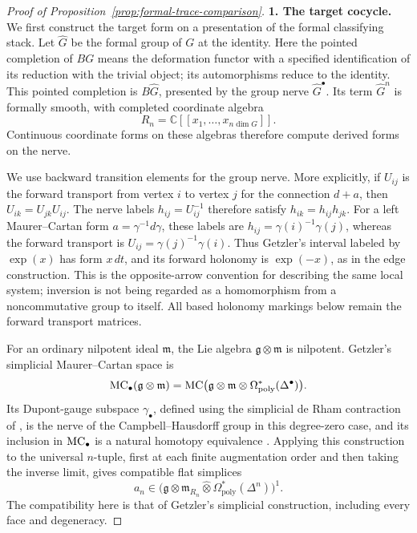 \begin{proof}[Proof of Proposition~\ref{prop:formal-trace-comparison}]
\noindent\textbf{1. The target cocycle.}\quad
We first construct the target form on a presentation of the formal
classifying stack.  Let \(\widehat G\) be the formal group of \(G\)
at the identity.  Here the pointed completion of \(BG\) means the
deformation functor with a specified identification of its reduction
with the trivial object; its automorphisms reduce to the identity.
This pointed completion is \(B\widehat G\), presented by the group nerve
\(\widehat G^\bullet\).  Its term \(\widehat G^n\) is formally smooth,
with completed coordinate algebra
\[
                  R_n=\mathbb C[[x_1,\ldots,x_{n\dim G}]].
\]
Continuous coordinate forms on these algebras therefore compute
derived forms on the nerve.

We use backward transition elements for the group nerve.  More explicitly,
if \(U_{ij}\) is the forward transport from vertex \(i\) to vertex \(j\)
for the connection \(d+a\), then
\(U_{ik}=U_{jk}U_{ij}\).  The nerve labels
\(h_{ij}=U_{ij}^{-1}\) therefore satisfy
\(h_{ik}=h_{ij}h_{jk}\).  For a left Maurer--Cartan form
\(a=\gamma^{-1}d\gamma\), these labels are
\(h_{ij}=\gamma(i)^{-1}\gamma(j)\), whereas the forward transport is
\(U_{ij}=\gamma(j)^{-1}\gamma(i)\).  Thus Getzler's interval labeled
by \(\exp(x)\) has form \(x\,dt\), and its forward holonomy is
\(\exp(-x)\), as in the edge construction.  This is the opposite-arrow
convention for describing the same local system; inversion is not being
regarded as a homomorphism from a noncommutative group to itself.  All
based holonomy markings below remain the forward transport matrices.

For an ordinary nilpotent ideal \(\mathfrak m\), the Lie algebra
\(\mathfrak g\otimes\mathfrak m\) is nilpotent.  Getzler's simplicial
Maurer--Cartan space is
\[
 \operatorname{MC}_\bullet(\mathfrak g\otimes\mathfrak m)
 =\operatorname{MC}\bigl(\mathfrak g\otimes\mathfrak m
                     \otimes\Omega_{\mathrm{poly}}^*(\Delta^\bullet)\bigr).
\]
Its Dupont-gauge subspace \(\gamma_\bullet\), defined using the
simplicial de Rham contraction of \cite{Dupont1976}, is the nerve of the
Campbell--Hausdorff group in this degree-zero case, and its inclusion
in \(\operatorname{MC}_\bullet\) is a natural homotopy equivalence
\cite[\S1, Theorem~5.4, and Corollary~5.11]{Getzler2009}.
Applying this construction to the universal \(n\)-tuple, first at
each finite augmentation order and then taking the inverse limit,
gives compatible flat simplices
\[
 a_n\in
 \bigl(\mathfrak g\otimes\mathfrak m_{R_n}
          \widehat\otimes\Omega_{\mathrm{poly}}^*(\Delta^n)\bigr)^1.
\]
The compatibility here is that of Getzler's simplicial construction,
including every face and degeneracy.


\end{proof}
